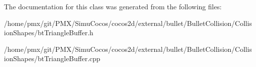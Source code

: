 The documentation for this class was generated from the following files\+:\begin{DoxyCompactItemize}
\item 
/home/pmx/git/\+P\+M\+X/\+Simu\+Cocos/cocos2d/external/bullet/\+Bullet\+Collision/\+Collision\+Shapes/bt\+Triangle\+Buffer.\+h\item 
/home/pmx/git/\+P\+M\+X/\+Simu\+Cocos/cocos2d/external/bullet/\+Bullet\+Collision/\+Collision\+Shapes/bt\+Triangle\+Buffer.\+cpp\end{DoxyCompactItemize}
